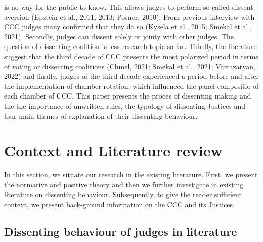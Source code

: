 \documentclass[
  11pt,
]{article}
\begin{document}
is no way for the public to know. This allows judges to perform
so-called dissent aversion (Epstein et al., 2011, 2013; Posner, 2010).
From previous interview with CCC judges many confirmed that they do so
(Kysela et al., 2015; Smekal et al., 2021). Secondly, judges can dissent
solely or jointy with other judges. The question of dissenting coalition
is less research topic so far. Thirdly, the literature suggest that the
third decade of CCC presents the most polarized period in terms of
voting or dissenting coalitions (Chmel, 2021; Smekal et al., 2021;
Vartazaryan, 2022) and finally, judges of the third decade experienced a
period before and after the implementation of chamber rotation, which
influenced the panel-compositio of each chamber of CCC. This paper
presents the proces of dissenting making and the the importance of
unwritten rules, the typology of dissenting Justices and four main
themes of explanation of their dissenting behaviour.

\hypertarget{context-and-literature-review}{%
\section{Context and Literature
review}\label{context-and-literature-review}}

In this section, we situate our research in the existing literature.
First, we present the normative and positive theory and then we further
investigate in existing literature on dissenting behaviour.
Subsequently, to give the reader sufficient context, we present
back-ground information on the CCC and its Justices.

\hypertarget{dissenting-behaviour-of-judges-in-literature}{%
\subsection{Dissenting behaviour of judges in
literature}\label{dissenting-behaviour-of-judges-in-literature}}
\end{document}
